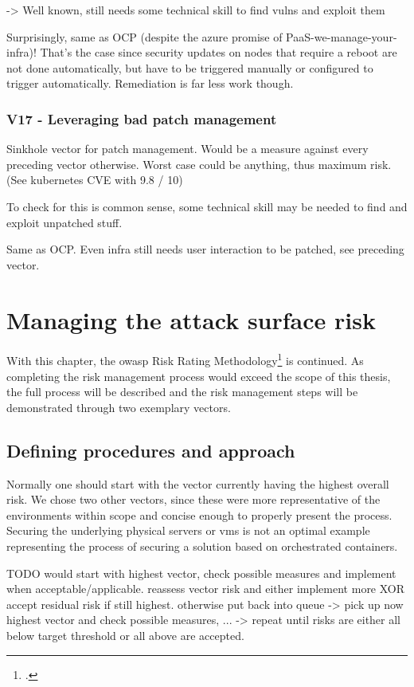 -> Well known, still needs some technical skill to find vulns and exploit them

Surprisingly, same as OCP (despite the azure promise of PaaS-we-manage-your-infra)!
That's the case since security updates on nodes that require a reboot are not done automatically, but have to be triggered manually or configured to trigger automatically.
Remediation is far less work though.

\subsection{V17 - Leveraging bad patch management}
Sinkhole vector for patch management. Would be a measure against every preceding vector otherwise.
Worst case could be anything, thus maximum risk. (See kubernetes CVE with 9.8 / 10)

To check for this is common sense, some technical skill may be needed to find and exploit unpatched stuff.

Same as OCP. Even infra still needs user interaction to be patched, see preceding vector.

\chapter{Managing the attack surface risk}

With this chapter, the \gls{owasp} Risk Rating Methodology\footcite{riskRating} is continued. As completing the risk management process would exceed the scope of this thesis, the full process will be described and the risk management steps will be demonstrated through two exemplary vectors.

\section{Defining procedures and approach}
Normally one should start with the vector currently having the highest overall risk. We chose two other vectors, since these were more representative of the environments within scope and concise enough to properly present the process. Securing the underlying physical servers or \gls{vm}s is not an optimal example representing the process of securing a solution based on orchestrated containers.

TODO would start with highest vector, check possible measures and implement when acceptable/applicable. reassess vector risk and either implement more XOR accept residual risk if still highest. otherwise put back into queue -> pick up now highest vector and check possible measures, ... -> repeat until risks are either all below target threshold or all above are accepted.

